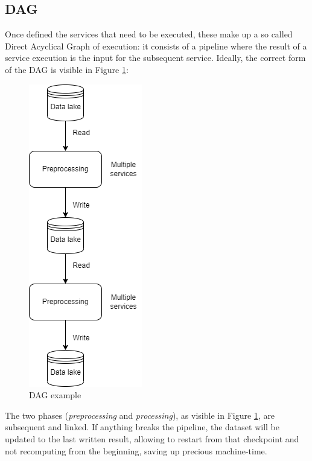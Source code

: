 \documentclass[\main/main.tex]{subfiles}
\begin{document}
\subsection{DAG}
Once defined the services that need to be executed, these make up a so called Direct Acyclical Graph of execution: it consists of a pipeline where the result of a service execution is the input for the subsequent service. Ideally, the correct form of the DAG is visible in Figure \ref{fig:dag_example}:
\begin{figure}[H]
    \centering
    \includegraphics[scale=.68]{images/architecture/dag_theory.png}
    \caption{DAG example}
    \label{fig:dag_example}
\end{figure}
The two phases (\emph{preprocessing} and \emph{processing}), as visible in Figure \ref{fig:dag_example}, are subsequent and linked. If anything breaks the pipeline, the dataset will be updated to the last written result, allowing to restart from that checkpoint and not recomputing from the beginning, saving up precious machine-time.
\end{document}
